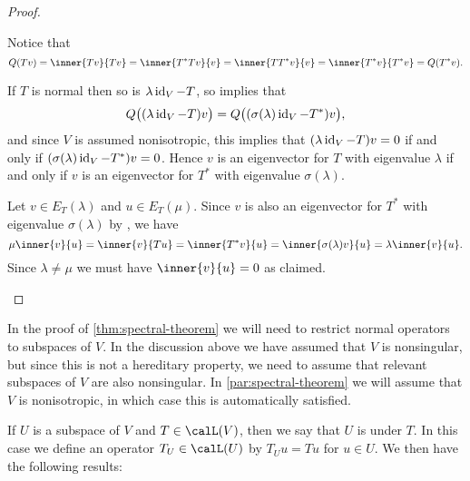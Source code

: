 \begin{proof}
\begin{proofsec*}
    \item[\itemref{enum:normal-adjoint-norm}]
    Notice that
    \begin{equation*}
        Q(Tv)
            = \inner{Tv}{Tv}
            = \inner{T^*Tv}{v}
            = \inner{TT^*v}{v}
            = \inner{T^*v}{T^*v}
            = Q(T^*v).
    \end{equation*}

    \item[\itemref{enum:normal-adjoint-eigenvalues}]
    If $T$ is normal then so is $\lambda \operatorname{id}_V - T$, so  implies that
    \begin{equation*}
        Q\bigl( (\lambda \operatorname{id}_V - T)v \bigr)
            = Q\bigl( (\sigma(\lambda) \operatorname{id}_V - T^*)v \bigr),
    \end{equation*}
    and since $V$ is assumed nonisotropic, this implies that $(\lambda \operatorname{id}_V - T)v = 0$ if and only if $(\sigma(\lambda) \operatorname{id}_V - T^*)v = 0$. Hence $v$ is an eigenvector for $T$ with eigenvalue $\lambda$ if and only if $v$ is an eigenvector for $T^*$ with eigenvalue $\sigma(\lambda)$.

    \item[\itemref{enum:normal-orthogonal-eigenspaces}]
    Let $v \in E_T(\lambda)$ and $u \in E_T(\mu)$. Since $v$ is also an eigenvector for $T^*$ with eigenvalue $\sigma(\lambda)$ by , we have
    \begin{equation*}
        \mu \inner{v}{u}
            = \inner{v}{Tu}
            = \inner{T^*v}{u}
            = \inner{\sigma(\lambda)v}{u}
            = \lambda \inner{v}{u}.
    \end{equation*}
    Since $\lambda \neq \mu$ we must have $\inner{v}{u} = 0$ as claimed.
\end{proofsec*}
\end{proof}


In the proof of \cref{thm:spectral-theorem} we will need to restrict normal operators to subspaces of $V$. In the discussion above we have assumed that $V$ is nonsingular, but since this is not a hereditary property, we need to assume that relevant subspaces of $V$ are also nonsingular. In \cref{par:spectral-theorem} we will assume that $V$ is nonisotropic, in which case this is automatically satisfied.

If $U$ is a subspace of $V$ and $T \in \lin(V)$, then we say that $U$ is  under $T$. In this case we define an operator $T_U \in \lin(U)$ by $T_U u = Tu$ for $u \in U$. We then have the following results:

